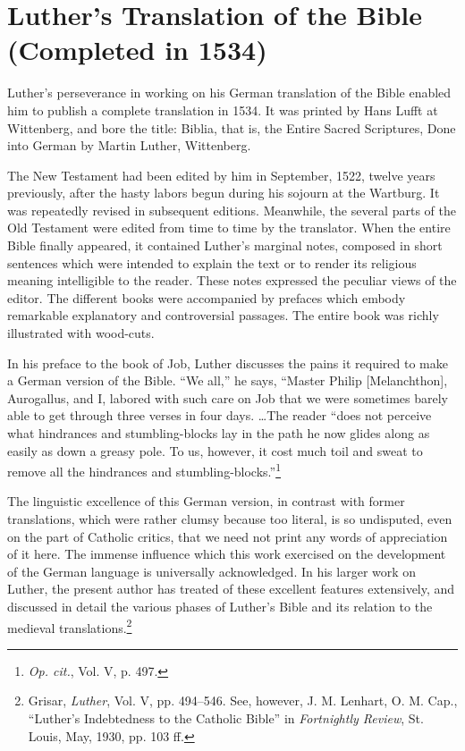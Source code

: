 \section{Luther’s Translation of the Bible (Completed in 1534)}

Luther’s perseverance in working on his German translation of
the Bible enabled him to publish a complete translation in 1534. It
was printed by Hans Lufft at Wittenberg, and bore the title: Biblia,
that is, the Entire Sacred Scriptures, Done into German by Martin
Luther, Wittenberg.

The New Testament had been edited by him in September, 1522,
twelve years previously, after the hasty labors begun during his
sojourn at the Wartburg. It was repeatedly revised in subsequent
editions. Meanwhile, the several parts of the Old Testament were
edited from time to time by the translator. When the entire Bible
finally appeared, it contained Luther’s marginal notes, composed in
short sentences which were intended to explain the text or to render
its religious meaning intelligible to the reader. These notes expressed
the peculiar views of the editor. The different books were accompanied
by prefaces which embody remarkable explanatory and controversial
passages. The entire book was richly illustrated with wood-cuts.

In his preface to the book of Job, Luther discusses the pains it
required to make a German version of the Bible. “We all,” he says,
“Master Philip [Melanchthon], Aurogallus, and I, labored with such
care on Job that we were sometimes barely able to get through three
verses in four days. \dots The reader “does not perceive what hindrances
and stumbling-blocks lay in the path he now glides along as
easily as down a greasy pole. To us, however, it cost much toil and
sweat to remove all the hindrances and stumbling-blocks.”\footnote
{\textit{Op. cit.}, Vol. V, p. 497.}

The linguistic excellence of this German version, in contrast with
former translations, which were rather clumsy because too literal, is
so undisputed, even on the part of Catholic critics, that we need not
print any words of appreciation of it here. The immense influence
which this work exercised on the development of the German language is
universally acknowledged. In his larger work on Luther, the
present author has treated of these excellent features extensively, and
discussed in detail the various phases of Luther’s Bible and its relation
to the medieval translations.\footnote
{Grisar, \textit{Luther}, Vol. V, pp. 494--546. See, however, J. M. Lenhart, O. M. Cap.,
``Luther’s Indebtedness to the Catholic Bible'' in \textit{Fortnightly Review}, St. Louis, May, 1930,
pp. 103 ff.}

